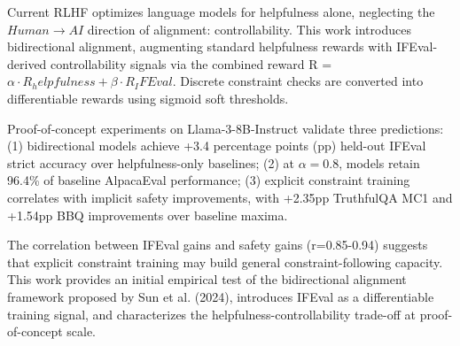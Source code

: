 
Current RLHF optimizes language models for helpfulness alone, neglecting the $Human\rightarrow AI$ direction of alignment: controllability. This work introduces bidirectional alignment, augmenting standard helpfulness rewards with IFEval-derived controllability signals via the combined reward R = $\alpha \cdot R_helpfulness + \beta \cdot R_IFEval$. Discrete constraint checks are converted into differentiable rewards using sigmoid soft thresholds.

Proof-of-concept experiments on Llama-3-8B-Instruct validate three predictions: (1) bidirectional models achieve +3.4 percentage points (pp) held-out IFEval strict accuracy over helpfulness-only baselines; (2) at $\alpha =0.8$, models retain 96.4\% of baseline AlpacaEval performance; (3) explicit constraint training correlates with implicit safety improvements, with +2.35pp TruthfulQA MC1 and +1.54pp BBQ improvements over baseline maxima.

The correlation between IFEval gains and safety gains (r=0.85-0.94) suggests that explicit constraint training may build general constraint-following capacity. This work provides an initial empirical test of the bidirectional alignment framework proposed by Sun et al. (2024), introduces IFEval as a differentiable training signal, and characterizes the helpfulness-controllability trade-off at proof-of-concept scale.
